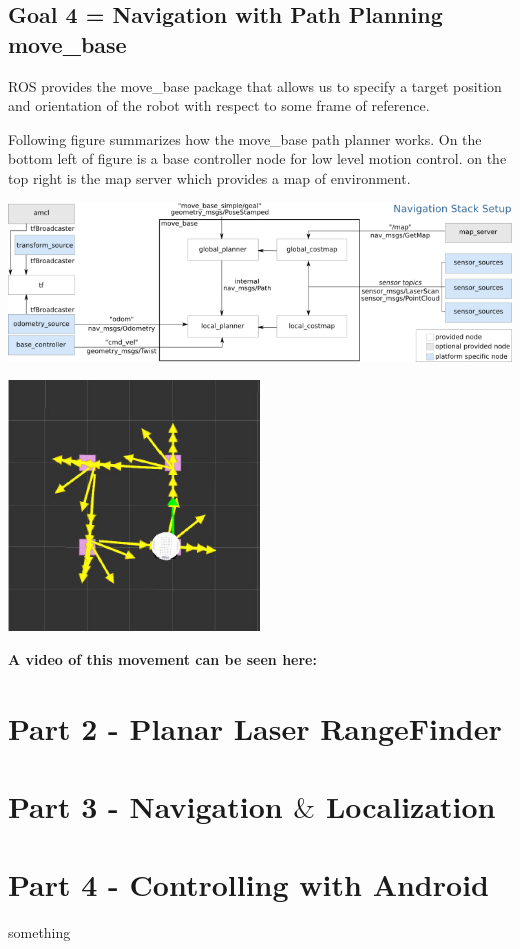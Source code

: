 \documentclass[10pt,a4paper]{article}
\begin{document}
\subsection{Goal 4 = Navigation with Path Planning move\_base}
ROS provides the move\_base package that allows us to specify a target position and orientation of the robot with respect to some frame of reference.

Following figure summarizes how the move\_base path planner works. On the bottom left of figure is a base controller node for low level motion control. on the top right is the map server which provides a map of environment.

\begin{center}
\includegraphics[width=\textwidth]{overview_small.png}
\end{center}


\begin{center}
\includegraphics[width=0.5\textwidth]{move_base.jpg}
\end{center}

\textbf{A video of this movement can be seen here:} \\

\section{Part 2 - Planar Laser RangeFinder}


\section{Part 3 - Navigation $\&$ Localization}

\section{Part 4 - Controlling with Android}


something
\end{document}
